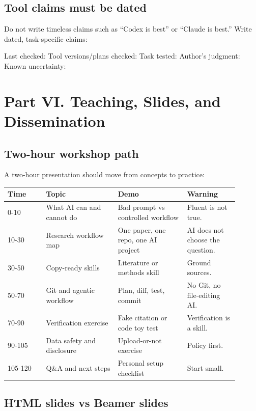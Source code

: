 \documentclass[11pt]{article}
\begin{document}
\subsection{Tool claims must be dated}

Do not write timeless claims such as ``Codex is best'' or ``Claude is best.'' Write dated, task-specific claims:

\begin{promptblock}
Last checked:
Tool versions/plans checked:
Task tested:
Author's judgment:
Known uncertainty:
\end{promptblock}

\section{Part VI. Teaching, Slides, and Dissemination}

\subsection{Two-hour workshop path}

A two-hour presentation should move from concepts to practice:

\begin{longtable}{p{0.15\linewidth}p{0.28\linewidth}p{0.27\linewidth}p{0.20\linewidth}}
\toprule
\textbf{Time} & \textbf{Topic} & \textbf{Demo} & \textbf{Warning}\\
\midrule
0-10 & What AI can and cannot do & Bad prompt vs controlled workflow & Fluent is not true.\\
10-30 & Research workflow map & One paper, one repo, one AI project & AI does not choose the question.\\
30-50 & Copy-ready skills & Literature or methods skill & Ground sources.\\
50-70 & Git and agentic workflow & Plan, diff, test, commit & No Git, no file-editing AI.\\
70-90 & Verification exercise & Fake citation or code toy test & Verification is a skill.\\
90-105 & Data safety and disclosure & Upload-or-not exercise & Policy first.\\
105-120 & Q\&A and next steps & Personal setup checklist & Start small.\\
\bottomrule
\end{longtable}

\subsection{HTML slides vs Beamer slides}
\end{document}
